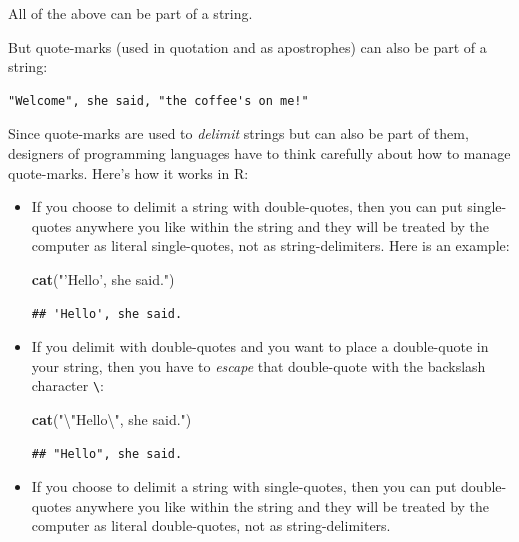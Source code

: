 \documentclass[]{book}
\makeatletter
\newenvironment{Shaded}{\begin{snugshade}}{\end{snugshade}}
\newcommand{\KeywordTok}[1]{\textcolor[rgb]{0.13,0.29,0.53}{\textbf{#1}}}
\newcommand{\CharTok}[1]{\textcolor[rgb]{0.31,0.60,0.02}{#1}}
\newcommand{\StringTok}[1]{\textcolor[rgb]{0.31,0.60,0.02}{#1}}
\newcommand{\NormalTok}[1]{#1}
\newenvironment{kframe}{%
\medskip{}
\setlength{\fboxsep}{.8em}
 \def\at@end@of@kframe{}%
 \ifinner\ifhmode%
  \def\at@end@of@kframe{\end{minipage}}%
  \begin{minipage}{\columnwidth}%
 \fi\fi%
 \def\FrameCommand##1{\hskip\@totalleftmargin \hskip-\fboxsep
 \colorbox{shadecolor}{##1}\hskip-\fboxsep
     \hskip-\linewidth \hskip-\@totalleftmargin \hskip\columnwidth}%
 \MakeFramed {\advance\hsize-\width
   \@totalleftmargin\z@ \linewidth\hsize
   \@setminipage}}%
 {\par\unskip\endMakeFramed%
 \at@end@of@kframe}
\renewenvironment{Shaded}{\begin{kframe}}{\end{kframe}}
\theoremstyle{definition}
\theoremstyle{definition}
\theoremstyle{definition}
\theoremstyle{remark}
\makeatother
\begin{document}
{All of the above can be part of a string.

But quote-marks (used in quotation and as apostrophes) can also be part
of a string:

\begin{verbatim}
"Welcome", she said, "the coffee's on me!"
\end{verbatim}

Since quote-marks are used to \emph{delimit} strings but can also be
part of them, designers of programming languages have to think carefully
about how to manage quote-marks. Here's how it works in R:

\begin{itemize}
\item
  If you choose to delimit a string with double-quotes, then you can put
  single-quotes anywhere you like within the string and they will be
  treated by the computer as literal single-quotes, not as
  string-delimiters. Here is an example:

\begin{Shaded}
\begin{Highlighting}[]
\KeywordTok{cat}\NormalTok{(}\StringTok{"'Hello', she said."}\NormalTok{)}
\end{Highlighting}
\end{Shaded}

\begin{verbatim}
## 'Hello', she said.
\end{verbatim}
\item
  If you delimit with double-quotes and you want to place a double-quote
  in your string, then you have to \emph{escape} that double-quote with
  the backslash character \texttt{\textbackslash{}}:

\begin{Shaded}
\begin{Highlighting}[]
\KeywordTok{cat}\NormalTok{(}\StringTok{"}\CharTok{\textbackslash{}"}\StringTok{Hello}\CharTok{\textbackslash{}"}\StringTok{, she said."}\NormalTok{)}
\end{Highlighting}
\end{Shaded}

\begin{verbatim}
## "Hello", she said.
\end{verbatim}
\item
  If you choose to delimit a string with single-quotes, then you can put
  double-quotes anywhere you like within the string and they will be
  treated by the computer as literal double-quotes, not as
  string-delimiters.


\end{itemize}}
\end{document}
